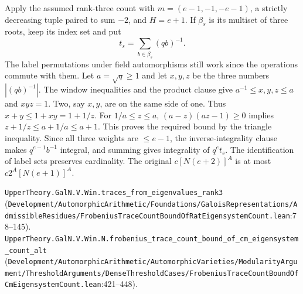 Apply the assumed rank-three count with $m=(e-1,-1,-e-1)$, a strictly decreasing tuple paired to sum $-2$, and $H=e+1$. If $\beta_s$ is its multiset of three roots, keep its index set and put
\[
           t_s=\sum_{b\in\beta_s}(qb)^{-1}.
\]
The label permutations under field automorphisms still work since the operations commute with them. Let $a=\sqrt q\ge1$ and let $x,y,z$ be the three numbers $|(qb)^{-1}|$. The window inequalities and the product clause give $a^{-1}\le x,y,z\le a$ and $xyz=1$. Two, say $x,y$, are on the same side of one. Thus $x+y\le 1+xy=1+1/z$. For $1/a\le z\le a$, $(a-z)(az-1)\ge0$ implies $z+1/z\le a+1/a\le a+1$. This proves the required bound by the triangle inequality. Since all three weights are $\le e-1$, the inverse-integrality clause makes $q^{e-1}b^{-1}$ integral, and summing gives integrality of $q^e t_s$. The identification of label sets preserves cardinality. The original $c[N(e+2)]^A$ is at most $c2^A[N(e+1)]^A$.
\par{\footnotesize \nolinkurl{UpperTheory.GalN.V.Win.traces_from_eigenvalues_rank3} (\nolinkurl{Development/AutomorphicArithmetic/Foundations/GaloisRepresentations/AdmissibleResidues/FrobeniusTraceCountBoundOfRatEigensystemCount.lean}\allowbreak:78--145). \nolinkurl{UpperTheory.GalN.V.Win.N.frobenius_trace_count_bound_of_cm_eigensystem_count_alt} (\nolinkurl{Development/AutomorphicArithmetic/AutomorphicVarieties/ModularityArgument/ThresholdArguments/DenseThresholdCases/FrobeniusTraceCountBoundOfCmEigensystemCount.lean}\allowbreak:421--448).\par}

